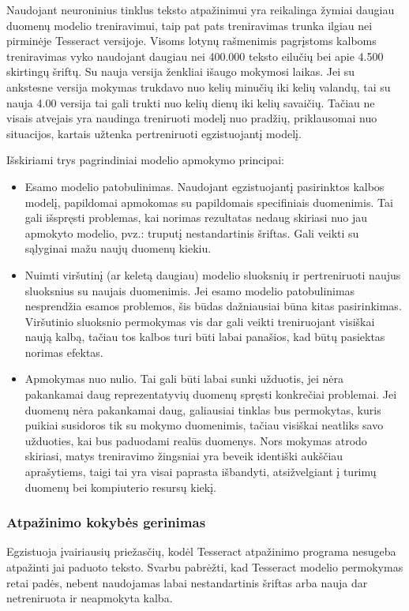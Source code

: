 \documentclass{VUMIFInfBakalaurinis}
\begin{document}
Naudojant neuroninius tinklus teksto atpažinimui yra reikalinga žymiai daugiau duomenų modelio treniravimui, taip pat pats 
treniravimas trunka ilgiau nei pirminėje Tesseract versijoje. Visoms lotynų rašmenimis pagrįstoms kalboms treniravimas vyko naudojant daugiau
nei 400.000 teksto eilučių bei apie 4.500 skirtingų šriftų. Su nauja versija ženkliai išaugo mokymosi laikas. Jei su ankstesne versija mokymas
trukdavo nuo kelių minučių iki kelių valandų, tai su nauja 4.00 versija tai gali trukti nuo kelių dienų iki kelių savaičių.
Tačiau ne visais atvejais yra naudinga treniruoti modelį nuo pradžių, priklausomai nuo situacijos, kartais užtenka pertreniruoti egzistuojantį modelį.

Išskiriami trys pagrindiniai modelio apmokymo principai:
\begin{itemize}
  \item Esamo modelio patobulinimas. Naudojant egzistuojantį pasirinktos kalbos modelį, papildomai apmokomas su papildomais specifiniais duomenimis.
  Tai gali išspręsti problemas, kai norimas rezultatas nedaug skiriasi nuo jau apmokyto modelio, pvz.: truputį nestandartinis šriftas.
  Gali veikti su sąlyginai mažu naujų duomenų kiekiu.
  \item Nuimti viršutinį (ar keletą daugiau) modelio sluoksnių ir pertreniruoti naujus sluoksnius su naujais duomenimis.
  Jei esamo modelio patobulinimas nesprendžia esamos problemos, šis būdas dažniausiai būna kitas pasirinkimas.
  Viršutinio sluoksnio permokymas vis dar gali veikti treniruojant visiškai naują kalbą, tačiau tos kalbos turi būti labai panašios, kad būtų pasiektas norimas efektas.
  \item Apmokymas nuo nulio. Tai gali būti labai sunki užduotis, jei nėra pakankamai daug reprezentatyvių duomenų spręsti konkrečiai problemai.
  Jei duomenų nėra pakankamai daug, galiausiai tinklas bus permokytas, kuris puikiai susidoros tik su mokymo duomenimis, tačiau visiškai neatliks savo užduoties,
  kai bus paduodami realūs duomenys. Nors mokymas atrodo skiriasi, matys treniravimo žingsniai yra beveik identiški aukščiau aprašytiems, taigi tai yra visai paprasta
  išbandyti, atsižvelgiant į turimų duomenų bei kompiuterio resursų kiekį.
\end{itemize}

\subsubsection{Atpažinimo kokybės gerinimas}
Egzistuoja įvairiausių priežasčių, kodėl Tesseract atpažinimo programa nesugeba atpažinti jai paduoto teksto.
Svarbu pabrėžti, kad Tesseract modelio permokymas retai padės, nebent naudojamas labai nestandartinis šriftas arba nauja dar netreniruota ir neapmokyta kalba.
\end{document}
